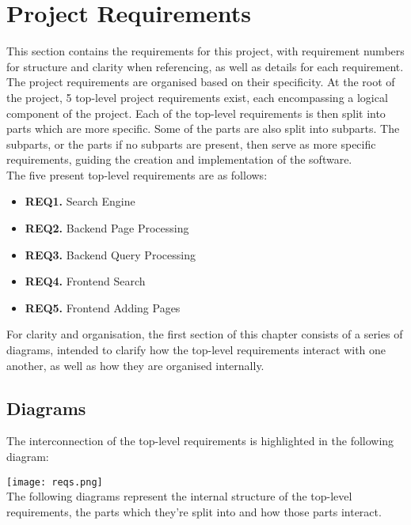 \section{Project Requirements}

This section contains the requirements for this project, with requirement numbers for structure and clarity when referencing, as well as details for each requirement.\\

The project requirements are organised based on their specificity. At the root of the project, 5 top-level project requirements exist, each encompassing a logical component of the project.
Each of the top-level requirements is then split into parts which are more specific. Some of the parts are also split into subparts. 
The subparts, or the parts if no subparts are present, then serve as more specific requirements, guiding the creation and implementation of the software.\\

The five present top-level requirements are as follows:
\begin{itemize}
    \item \textbf{REQ1.} Search Engine
    \item \textbf{REQ2.} Backend Page Processing
    \item \textbf{REQ3.} Backend Query Processing
    \item \textbf{REQ4.} Frontend Search
    \item \textbf{REQ5.} Frontend Adding Pages
\end{itemize}

For clarity and organisation, the first section of this chapter consists of a series of diagrams, intended to clarify how the top-level requirements interact with one another,
as well as how they are organised internally.

\subsection{Diagrams}

The interconnection of the top-level requirements is highlighted in the following diagram:

\texttt{[image: reqs.png]}\\

The following diagrams represent the internal structure of the top-level requirements, the parts which they're split into and how those parts interact.\\

